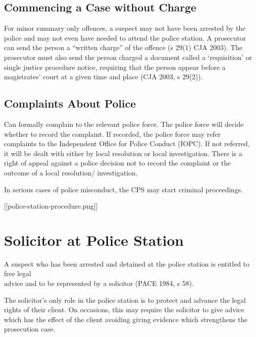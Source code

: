 \documentclass[
]{article}
\begin{document}
\hypertarget{commencing-a-case-without-charge}{%
\subsection{Commencing a Case without
Charge}\label{commencing-a-case-without-charge}}

For minor summary only offences, a suspect may not have been arrested by
the police and may not even have needed to attend the police station. A
prosecutor can send the person a ``written charge'' of the offence (s
29(1) CJA 2003). The prosecutor must also send the person charged a
document called a `requisition' or single justice procedure notice,
requiring that the person appear before a magistrates' court at a given
time and place (CJA 2003, s 29(2)).

\hypertarget{complaints-about-police}{%
\subsection{Complaints About Police}\label{complaints-about-police}}

Can formally complain to the relevant police force. The police force
will decide whether to record the complaint. If recorded, the police
force may refer complaints to the Independent Office for Police Conduct
(IOPC). If not referred, it will be dealt with either by local
resolution or local investigation. There is a right of appeal against a
police decision not to record the complaint or the outcome of a local
resolution/ investigation.

In serious cases of police misconduct, the CPS may start criminal
proceedings.

{[}{[}police-station-procedure.png{]}{]}

\hypertarget{solicitor-at-police-station}{%
\section{Solicitor at Police
Station}\label{solicitor-at-police-station}}

A suspect who has been arrested and detained at the police station is
entitled to free legal\\
advice and to be represented by a solicitor (PACE 1984, s 58).

The solicitor's only role in the police station is to protect and
advance the legal rights of their client. On occasions, this may require
the solicitor to give advice which has the effect of the client avoiding
giving evidence which strengthens the prosecution case.
\end{document}
